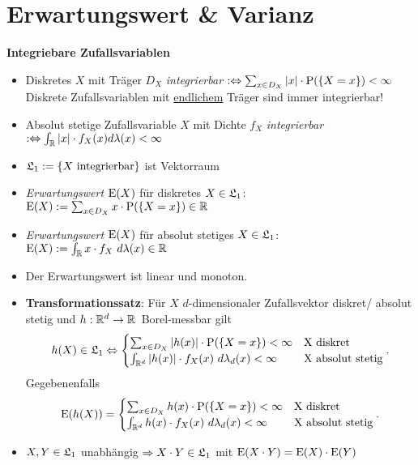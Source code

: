 \section{Erwartungswert \& Varianz}

\textbf{Integriebare Zufallsvariablen}
\begin{itemize}
\item Diskretes $X$ mit Träger $D_X$ \textit{integrierbar}
$:\Leftrightarrow \sum_{x\in D_X} |x|\cdot \P(\{X=x\})<\infty$\\
Diskrete Zufallsvariablen mit \underline{endlichem} Träger sind immer integrierbar!

\item  Absolut stetige Zufallsvariable $X$ mit Dichte $f_X$ \textit{integrierbar}
\mbox{$:\Leftrightarrow \int_\R |x|\cdot f_X(x)d\lambda(x)<\infty$}

\item $\L_1:=\{X \text{ integrierbar}\}$ ist Vektorraum

\item \textit{Erwartungswert $\E(X)$} für diskretes $X\in\L_1$:
$\E(X):= \sum_{x\in D_X} x\cdot\P(\{X=x\})\in\R$

\item \textit{Erwartungswert $\E(X)$} für absolut stetiges $X\in\L_1$:
$\E(X):= \int_\R x\cdot f_X~d\lambda(x)\in\R$

\item Der Erwartungswert ist linear und monoton.

\item \textbf{Transformationssatz}: Für $X$ $d$-dimensionaler Zufallsvektor diskret/
absolut stetig und \mbox{$h:\R^d\to\R$ Borel-messbar} gilt
\[
	h(X)\in\L_1 \Leftrightarrow
	\begin{cases}
	\sum_{x\in D_X} |h(x)|\cdot\P(\{X=x\})<\infty			& \text{X diskret} \\
	\int_{\R^d} |h(x)|\cdot f_X(x)~d\lambda_d(x)<\infty	& \text{X absolut stetig}
	\end{cases}.
\]
Gegebenenfalls
\[
	\E(h(X))=
	\begin{cases}
	\sum_{x\in D_X} h(x)\cdot\P(\{X=x\})<\infty			& \text{X diskret} \\
	\int_{\R^d} h(x)\cdot f_X(x)~d\lambda_d(x)<\infty		& \text{X absolut stetig}
	\end{cases}.
\]

\item $X,Y\in\L_1$ unabhängig
$\Rightarrow X\cdot Y\in\L_1$ mit $\E(X\cdot Y) = \E(X)\cdot \E(Y)$
\marginpar{\vspace{-2.2em}\begin{equation}\label{unabhaengig_e}\end{equation}}

\end{itemize}
\hspace{3em}

